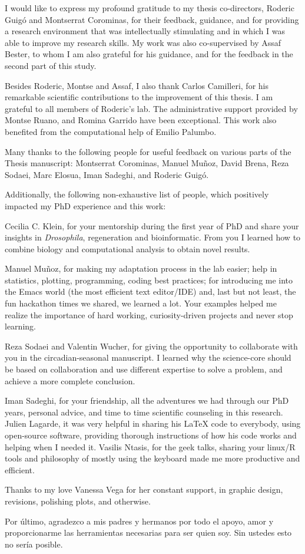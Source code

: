 I would like to express my profound gratitude to my thesis co-directors, Roderic Guigó and Montserrat Corominas, for their feedback, guidance, and for providing a research environment that was intellectually stimulating and in which I was able to improve my research skills. My work was also co-supervised by Assaf Bester, to whom I am also grateful for his guidance, and for the feedback in the second part of this study.  

Besides Roderic, Montse and Assaf, I also thank Carlos Camilleri, for his remarkable scientific contributions to the improvement of this thesis. I am grateful to all members of Roderic’s lab.
The administrative support provided by Montse Ruano, and Romina Garrido have been exceptional. This work also benefited from the computational help of Emilio Palumbo. 

Many thanks to the following people for useful feedback on various parts of the Thesis manuscript: Montserrat Corominas, Manuel Muñoz, David Brena, Reza Sodaei, Marc Elosua, Iman Sadeghi, and Roderic Guigó. 

Additionally, the following non-exhaustive list of people, which positively impacted my PhD experience and this work:  

Cecilia C. Klein, for your mentorship during the first year of PhD and share your insights in \textit{Drosophila}, regeneration and bioinformatic. From you I learned how to combine biology and computational analysis to obtain novel results. 

Manuel Muñoz, for making my adaptation process in the lab easier; help in statistics, plotting, programming, coding best practices; for introducing me into the Emacs world (the most efficient text editor/IDE) and, last but not least, the fun hackathon times we shared, we learned a lot. Your examples helped me realize the importance of hard working, curiosity-driven projects and never stop learning.

Reza Sodaei and Valentin Wucher, for giving the opportunity to collaborate with you in the circadian-seasonal manuscript. I learned why the science-core should be based on collaboration and use different expertise to solve a problem, and achieve a more complete conclusion.  

Iman Sadeghi, for your friendship, all the adventures we had through our PhD years, personal advice, and time to time scientific counseling in this research. Julien Lagarde, it was very helpful in sharing his LaTeX code to everybody,  using open-source software, providing thorough instructions of how his code works and helping when I needed it. Vasilis Ntasis, for the geek talks, sharing your linux/R tools and philosophy of mostly using the keyboard made me more productive and efficient.    

Thanks to my love Vanessa Vega for her constant support, in graphic design, revisions, polishing plots, and otherwise.

Por último, agradezco a mis padres y hermanos por todo el apoyo, amor y proporcionarme las herramientas necesarias para ser quien soy. Sin ustedes esto no sería posible.  


